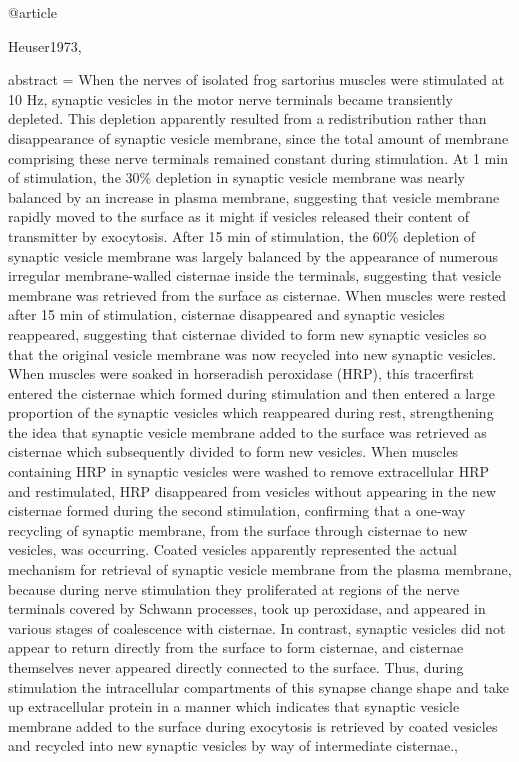 @article{Heuser1973,

abstract = {When the nerves of isolated frog sartorius muscles were stimulated at 10 Hz, synaptic vesicles in the motor nerve terminals became transiently depleted. This depletion apparently resulted from a redistribution rather than disappearance of synaptic vesicle membrane, since the total amount of membrane comprising these nerve terminals remained constant during stimulation. At 1 min of stimulation, the 30{\%} depletion in synaptic vesicle membrane was nearly balanced by an increase in plasma membrane, suggesting that vesicle membrane rapidly moved to the surface as it might if vesicles released their content of transmitter by exocytosis. After 15 min of stimulation, the 60{\%} depletion of synaptic vesicle membrane was largely balanced by the appearance of numerous irregular membrane-walled cisternae inside the terminals, suggesting that vesicle membrane was retrieved from the surface as cisternae. When muscles were rested after 15 min of stimulation, cisternae disappeared and synaptic vesicles reappeared, suggesting that cisternae divided to form new synaptic vesicles so that the original vesicle membrane was now recycled into new synaptic vesicles. When muscles were soaked in horseradish peroxidase (HRP), this tracerfirst entered the cisternae which formed during stimulation and then entered a large proportion of the synaptic vesicles which reappeared during rest, strengthening the idea that synaptic vesicle membrane added to the surface was retrieved as cisternae which subsequently divided to form new vesicles. When muscles containing HRP in synaptic vesicles were washed to remove extracellular HRP and restimulated, HRP disappeared from vesicles without appearing in the new cisternae formed during the second stimulation, confirming that a one-way recycling of synaptic membrane, from the surface through cisternae to new vesicles, was occurring. Coated vesicles apparently represented the actual mechanism for retrieval of synaptic vesicle membrane from the plasma membrane, because during nerve stimulation they proliferated at regions of the nerve terminals covered by Schwann processes, took up peroxidase, and appeared in various stages of coalescence with cisternae. In contrast, synaptic vesicles did not appear to return directly from the surface to form cisternae, and cisternae themselves never appeared directly connected to the surface. Thus, during stimulation the intracellular compartments of this synapse change shape and take up extracellular protein in a manner which indicates that synaptic vesicle membrane added to the surface during exocytosis is retrieved by coated vesicles and recycled into new synaptic vesicles by way of intermediate cisternae.},

}
